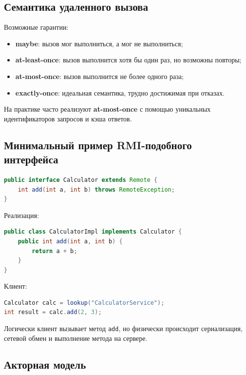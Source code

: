 \documentclass[12pt,a4paper]{article}
\begin{document}
\subsection{Семантика удаленного вызова}

Возможные гарантии:
\begin{itemize}
    \item \textbf{maybe}: вызов мог выполниться, а мог не выполниться;
    \item \textbf{at-least-once}: вызов выполнится хотя бы один раз, но возможны повторы;
    \item \textbf{at-most-once}: вызов выполнится не более одного раза;
    \item \textbf{exactly-once}: идеальная семантика, трудно достижимая при отказах.
\end{itemize}

На практике часто реализуют \textbf{at-most-once} с помощью уникальных идентификаторов запросов и кэша ответов.

\subsection{Минимальный пример RMI-подобного интерфейса}

\begin{lstlisting}[language=Java]
public interface Calculator extends Remote {
    int add(int a, int b) throws RemoteException;
}
\end{lstlisting}

Реализация:

\begin{lstlisting}[language=Java]
public class CalculatorImpl implements Calculator {
    public int add(int a, int b) {
        return a + b;
    }
}
\end{lstlisting}

Клиент:

\begin{lstlisting}[language=Java]
Calculator calc = lookup("CalculatorService");
int result = calc.add(2, 3);
\end{lstlisting}

Логически клиент вызывает метод \texttt{add}, но физически происходит сериализация, сетевой обмен и выполнение метода на сервере.

\subsection{Акторная модель}
\end{document}
